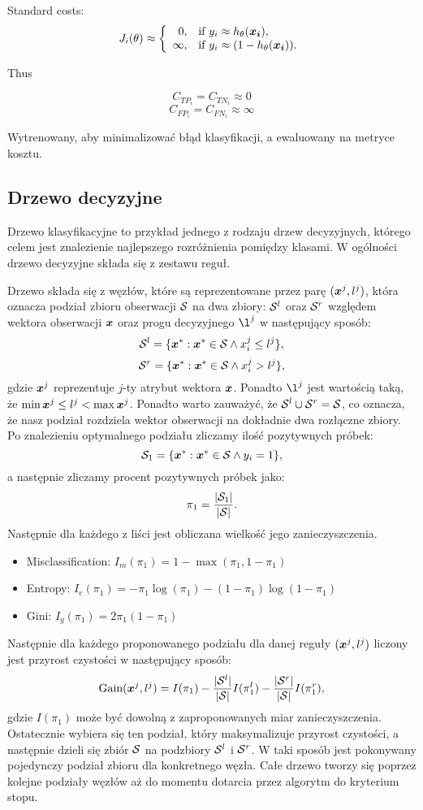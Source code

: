 \documentclass{book}
\begin{document}

    Standard costs:
	$$
	J_i(\theta) \approx \left\{
	\begin{array}{rl}
	0, &\mbox{if $y_i \approx h_{\theta}(\boldsymbol{x_i})$}, \\
	\infty, &\mbox{if $y_i \approx (1 - h_{\theta}(\boldsymbol{x_i}))$}.
	\end{array}{}
	\right.
	$$
	
	Thus
	
	$$ C_{TP_i} = C_{TN_i} \approx 0 $$
	$$ C_{FP_i} = C_{FN_i} \approx \infty $$

	Wytrenowany, aby minimalizować błąd klasyfikacji, a ewaluowany na metryce kosztu.

\subsection{Drzewo decyzyjne}

	Drzewo klasyfikacyjne to przykład jednego z rodzaju drzew decyzyjnych, którego celem jest znalezienie najlepszego rozróżnienia pomiędzy klasami. W ogólności drzewo decyzyjne składa się z zestawu reguł.
	
	Drzewo składa się z węzłów, które są reprezentowane przez parę $(\boldsymbol{x}^j, l^j)$, która oznacza podział zbioru obserwacji $\mathcal{S}$ na dwa zbiory: $\mathcal{S}^{l}$ oraz $\mathcal{S}^{r}$ względem wektora obserwacji $\boldsymbol{x}$ oraz progu decyzyjnego $\l^j$ w następujący sposób:
	$$ \mathcal{S}^l = \{ \boldsymbol{x}^* : \boldsymbol{x}^* \in \mathcal{S} \land x^j_i \leq l^j \} \text{,} $$
	$$ \mathcal{S}^r = \{ \boldsymbol{x}^* : \boldsymbol{x}^* \in \mathcal{S} \land x^j_i > l^j \} \text{,} $$
	gdzie $\boldsymbol{x}^j$ reprezentuje $j$-ty atrybut wektora $\boldsymbol{x}$. Ponadto $\l^j$ jest wartością taką, że $\min{\boldsymbol{x}^j} \leq l^j < \max{\boldsymbol{x}^j}$. Ponadto warto zauważyć, że $\mathcal{S}^l \cup \mathcal{S}^r = \mathcal{S}$, co oznacza, że nasz podział rozdziela wektor obserwacji na dokładnie dwa rozłączne zbiory.
	Po znalezieniu optymalnego podziału zliczamy ilość pozytywnych próbek:
	$$ \mathcal{S}_1  = \{ \boldsymbol{x}^* : \boldsymbol{x}^* \in \mathcal{S} \land y_i = 1 \} \text{,} $$
	a następnie zliczamy procent pozytywnych próbek jako:
	$$ \pi_1 = \frac{|\mathcal{S}_1|}{|\mathcal{S}|} \text{.}$$
	Następnie dla każdego z liści jest obliczana wielkość jego zanieczyszczenia.
	\begin{itemize}
		\item Misclassification: $I_m(\pi_1) = 1 - \max(\pi_1, 1 - \pi_1)$
		\item Entropy: $I_e(\pi_1) = -\pi_1 \log(\pi_1) - (1 - \pi_1) \log (1 - \pi_1)$
		\item Gini: $I_g(\pi_1) = 2 \pi_1 (1 - \pi_1)$
	\end{itemize}{}
	Następnie dla każdego proponowanego podziału dla danej reguły $(\boldsymbol{x}^j, l^j)$ liczony jest przyrost czystości w następujący sposób:
	$$ \text{Gain}(\boldsymbol{x}^j, l^j) = I(\pi_1) - \frac{|\mathcal{S}^l|}{|\mathcal{S}|} I(\pi_1^l) - \frac{|\mathcal{S}^r|}{|\mathcal{S}|} I(\pi_1^r) \text{,}$$
	gdzie $I(\pi_1)$ może być dowolną z zaproponowanych miar zanieczyszczenia.
	Ostatecznie wybiera się ten podział, który maksymalizuje przyrost czystości, a następnie dzieli się zbiór $\mathcal{S}$ na podzbiory $\mathcal{S}^l$ i $\mathcal{S}^r$.
	W taki sposób jest pokonywany pojedynczy podział zbioru dla konkretnego węzła. Całe drzewo tworzy się poprzez kolejne podziały węzłów aż do momentu dotarcia przez algorytm do kryterium stopu.
	
\end{document}

